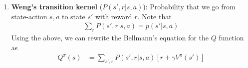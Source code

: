 \begin{enumerate}
\begin{align}
    \end{align}
    Note that there is an abuse of notation for $r$ where we assume that the subscript informs us of what it actually means. The above equation is the \textbf{Bellmann equation for the Q function}.
    \item \textbf{Weng's transition kernel} ($P(s',r|s,a)$): Probability that we go from state-action $s,a$ to state $s'$ with reward $r$. Note that 
    \begin{align}
        \sum_{r} P(s',r|s,a) = p(s'|s,a) 
    \end{align}
    Using the above, we can rewrite the Bellmann's equation for the $Q$ function as 
    \begin{align}\label{eq:Bellman_eqn_for_Q_function_v3}
        Q^{\pi}(s) &=\sum_{s',r} P(s',r|s,a)\left[r + \gamma V^{\pi}(s') \right] 
    \end{align}
\end{enumerate}




